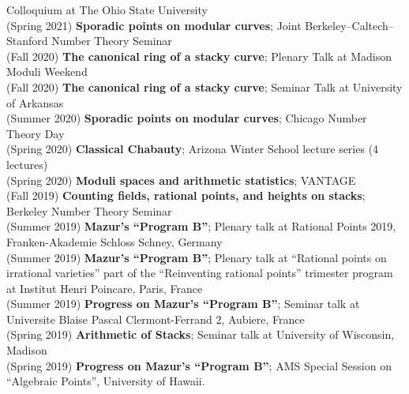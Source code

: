 \documentclass[margin,line]{res}
\begin{document}
\begin{resume}
Colloquium at The Ohio State University 
\vspace{.05cm}\\
(Spring 2021) \textbf{Sporadic points on modular curves};
Joint Berkeley--Caltech--Stanford Number Theory Seminar
\vspace{.05cm}\\
(Fall 2020) \textbf{The canonical ring of a stacky curve};  
Plenary Talk at Madison Moduli Weekend 
\vspace{.05cm}\\
(Fall 2020) \textbf{The canonical ring of a stacky curve};  
Seminar Talk at University of Arkansas
\vspace{.05cm}\\
(Summer 2020) \textbf{Sporadic points on modular curves};
Chicago Number Theory Day 
\vspace{.05cm}\\
(Spring 2020) \textbf{Classical Chabauty};
Arizona Winter School lecture series (4 lectures)
\vspace{.05cm}\\
(Spring 2020) \textbf{Moduli spaces and arithmetic statistics};
VANTAGE
\vspace{.05cm}\\
(Fall 2019) \textbf{Counting fields, rational points, and heights on stacks};
Berkeley Number Theory Seminar
\vspace{.05cm}\\
(Summer 2019) \textbf{Mazur's ``Program B''};  
Plenary talk at Rational Points 2019, Franken-Akademie Schloss Schney, Germany
\vspace{.05cm}\\
(Summer 2019) \textbf{Mazur's ``Program B''};  
Plenary talk at ``Rational points on irrational varieties'' part of the  ``Reinventing rational points'' trimester program at Institut Henri Poincare, Paris, France
\\
(Summer 2019) \textbf{Progress on Mazur's ``Program B''};  
Seminar talk at Universite Blaise Pascal Clermont-Ferrand 2, Aubiere, France
\vspace{.05cm}\\
(Spring 2019) \textbf{Arithmetic of Stacks};  
Seminar talk at  University of Wisconsin, Madison
\vspace{.05cm}\\
(Spring 2019) \textbf{Progress on Mazur's ``Program B''};  
AMS Special Session on ``Algebraic Points'', University of Hawaii.
\vspace{.05cm}\\

\end{resume}
\end{document}
